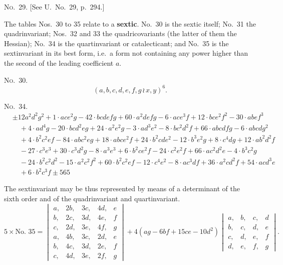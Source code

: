 \documentclass[11pt,a4paper]{book}
\begin{document}
\begin{center}
\noindent\textsc{No.~29.} [See U.\ No.~29, p.~294.]

The tables Nos.~30 to 35 relate to a \textbf{sextic}.
No.~30 is the sextic itself; No.~31 the quadrinvariant; Nos.~32 and 33 the quadricovariants
(the latter of them the Hessian); No.~34 is the quartinvariant or catalecticant;
and No.~35 is the sextinvariant in its best form, i.e.\ a form not containing any
power higher than the second of the leading coefficient $a$.

\noindent\textsc{No.~30.}
\[(a, b, c, d, e, f, g \, \wr\, x, y)^6.\]

\noindent\textsc{No.~34.}
\begin{align*}
&\pm 12 a^2d^2g^2 + 1\cdot ace^2g - 42\cdot bcdefg + 60\cdot a^2defg - 6\cdot ace^3f + 12\cdot bce^2f^2 - 30\cdot abef^3\\
&\quad + 4\cdot ad^4g - 20\cdot bcd^2eg + 24\cdot a^2e^2g - 3\cdot ad^3e^2 - 8\cdot bc^2d^2f + 66\cdot abcdfg - 6\cdot abcdg^2\\
&\quad + 4\cdot b^2c^2ef - 84\cdot abc^2eg + 18\cdot abce^2f + 24\cdot b^2cde^2 - 12\cdot b^3e^2g + 8\cdot c^4dg + 12\cdot ab^2d^2f\\
&\quad - 27\cdot c^3e^3 + 30\cdot c^3d^2g - 8\cdot a^3e^3 + 6\cdot b^2ce^2f - 24\cdot c^2e^2f + 66\cdot ac^2d^2e - 4\cdot b^3c^2g\\
&\quad - 24\cdot b^2c^2d^2 - 15\cdot a^2c^2f^2 + 60\cdot b^2c^2ef - 12\cdot c^4e^2 - 8\cdot ac^3df + 36\cdot a^2cd^2f + 54\cdot acd^3e\\
&\quad + 6\cdot b^2c^3f \pm 565
\end{align*}

The sextinvariant may be thus represented by means of a determinant of the
sixth order and of the quadrinvariant and quartinvariant.
\[5 \times \text{No.~35} =
\begin{vmatrix}
a, & 2b, & 3c, & 4d, & e \\
b, & 2c, & 3d, & 4e, & f \\
c, & 2d, & 3e, & 4f, & g \\
a, & 4b, & 3c, & 2d, & e \\
b, & 4c, & 3d, & 2e, & f \\
c, & 4d, & 3e, & 2f, & g
\end{vmatrix}
+ 4(ag - 6bf + 15ce - 10d^2)
\begin{vmatrix}
a, & b, & c, & d \\
b, & c, & d, & e \\
c, & d, & e, & f \\
d, & e, & f, & g
\end{vmatrix}.\]


\end{center}
\end{document}
